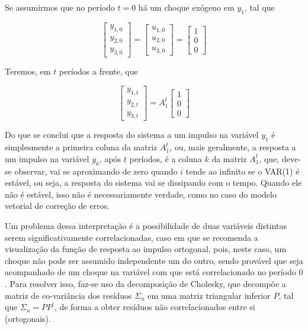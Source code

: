 \documentclass[a4paper,
               article,
               12pt,
               openany,
               oneside,
               english,
               brazil]{abntex2}
\numberwithin{equation}{section}
\begin{document}
    Se assumirmos que no período $ t = 0 $ há um choque exógeno em $ y_1 $, tal que

    \begin{equation*}
        \begin{bmatrix}
            y_{1,0} \\
            y_{2,0} \\
            y_{3,0}
        \end{bmatrix} =
        \begin{bmatrix}
            u_{1,0} \\
            u_{2,0} \\
            u_{3,0}
        \end{bmatrix} =
        \begin{bmatrix}
            1 \\
            0 \\
            0
        \end{bmatrix}
    \end{equation*}

    Teremos, em $ t $ períodos a frente, que

    \begin{equation*}
        \begin{bmatrix}
            y_{1,t} \\
            y_{2,t} \\
            y_{3,t}
        \end{bmatrix} =
        A_1^{t}
        \begin{bmatrix}
            1 \\
            0 \\
            0
        \end{bmatrix}
    \end{equation*}

    Do que se conclui que a resposta do sistema a um impulso na variável $ y_1 $ é simplesmente a primeira coluna da matriz $ A_1^{t} $, ou, mais geralmente, a resposta a um impulso na variável $ y_k $, após $ t $ períodos, é a coluna $ k $ da matriz $ A_1^{t} $, que, deve-se observar, vai se aproximando de zero quando $ i $ tende ao infinito se o VAR(1) é estável, ou seja, a resposta do sistema vai se dissipando com o tempo. Quando ele não é estável, isso não é necessariamente verdade, como no caso do modelo vetorial de correção de erros.

   Um problema dessa interpretação é a possibilidade de duas variáveis distintas serem significativamente correlacionadas, caso em que se recomenda a visualização da função de resposta ao impulso ortogonal, pois, neste caso, um choque não pode ser assumido independente um do outro, sendo provável que seja acompanhado de um choque na variável com que está correlacionado no período $ 0 $. Para resolver isso, faz-se uso da decomposição de Cholesky, que decompõe a matriz de co-variância dos resíduos $ \Sigma_u $ em uma matriz triangular inferior $ P $, tal que $ \Sigma_u = PP^{'} $, de forma a obter resíduos não correlacionados entre si (ortogonais).
\end{document}
